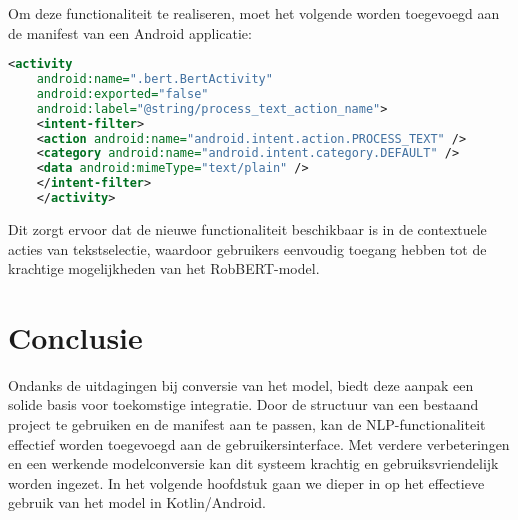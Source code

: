 Om deze functionaliteit te realiseren, moet het volgende worden toegevoegd aan de manifest van een Android applicatie:

\begin{lstlisting}[language=xml, caption={Toevoegen van BERT aan geselecteerde tekst opties}]
    <activity
    android:name=".bert.BertActivity"
    android:exported="false"
    android:label="@string/process_text_action_name">
    <intent-filter>
    <action android:name="android.intent.action.PROCESS_TEXT" />
    <category android:name="android.intent.category.DEFAULT" />
    <data android:mimeType="text/plain" />
    </intent-filter>
    </activity>
\end{lstlisting}

Dit zorgt ervoor dat de nieuwe functionaliteit beschikbaar is in de contextuele acties van tekstselectie, waardoor gebruikers eenvoudig toegang hebben tot de krachtige mogelijkheden van het RobBERT-model.

\section{Conclusie}

Ondanks de uitdagingen bij conversie van het model, biedt deze aanpak een solide basis voor toekomstige integratie. Door de structuur van een bestaand project te gebruiken en de manifest aan te passen, kan de NLP-functionaliteit effectief worden toegevoegd aan de gebruikersinterface. Met verdere verbeteringen en een werkende modelconversie kan dit systeem krachtig en gebruiksvriendelijk worden ingezet. In het volgende hoofdstuk gaan we dieper in op het effectieve gebruik van het model in Kotlin/Android.